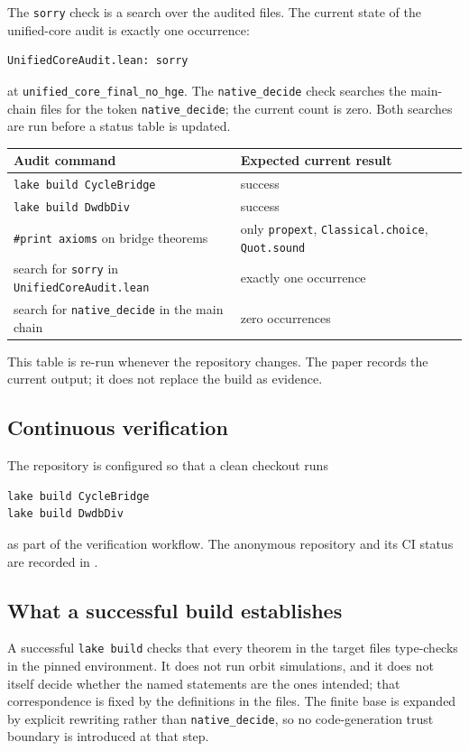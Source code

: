 The \texttt{sorry} check is a search over the audited files.  The
current state of the unified-core audit is exactly one occurrence:
\begin{verbatim}
UnifiedCoreAudit.lean: sorry
\end{verbatim}
at \texttt{unified\_core\_final\_no\_hge}.  The \texttt{native\_decide}
check searches the main-chain files for the token
\texttt{native\_decide}; the current count is zero.  Both searches are
run before a status table is updated.

\begin{center}
\small
\begin{tabular}{@{}p{}p{}@{}}
\toprule
Audit command & Expected current result \\
\midrule
\texttt{lake build CycleBridge} & success \\
\texttt{lake build DwdbDiv} & success \\
\texttt{\#print axioms} on bridge theorems &
  only \texttt{propext}, \texttt{Classical.choice}, \texttt{Quot.sound} \\
search for \texttt{sorry} in \texttt{UnifiedCoreAudit.lean} &
  exactly one occurrence \\
search for \texttt{native\_decide} in the main chain &
  zero occurrences \\
\bottomrule
\end{tabular}
\end{center}

This table is re-run whenever the repository changes.  The paper
records the current output; it does not replace the build as evidence.

\subsection{Continuous verification}

The repository is configured so that a clean checkout runs
\begin{verbatim}
lake build CycleBridge
lake build DwdbDiv
\end{verbatim}
as part of the verification workflow.  The anonymous repository and its
CI status are recorded in \cite{stringflowproof}.

\subsection{What a successful build establishes}

A successful \texttt{lake build} checks that every theorem in the
target files type-checks in the pinned environment.  It does not run
orbit simulations, and it does not itself decide whether the named
statements are the ones intended; that correspondence is fixed by the
definitions in the files.  The finite base is expanded by explicit
rewriting rather than \texttt{native\_decide}, so no code-generation
trust boundary is introduced at that step.


